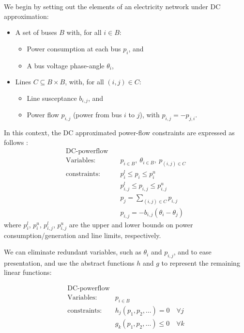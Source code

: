 We begin by setting out the elements of an electricity network under DC approximation:
\begin{itemize}
    \item A set of buses $B$ with, for all $i\in B$:
    \begin{itemize} 
        \item Power consumption at each bus $p_i$, and 
        \item A bus voltage phase-angle $\theta_i$,
    \end{itemize}
    \item Lines $C\subseteq B\times B$, with, for all $(i,j)\in C$: 
        \begin{itemize} 
        \item Line susceptance $b_{i,j}$, and 
        \item Power flow $p_{i,j}$ (power from bus $i$ to $j$), with $p_{i,j}=-p_{j,i}$. 
    \end{itemize}
\end{itemize}
In this context, the DC approximated power-flow constraints are expressed as follows \cite{Wang1}:
\begin{equation}
\label{dcopf1}
\begin{aligned}
\text{DC-powerflow} \quad& \\
\text{Variables:} \quad&  p_{i\in B},\ \theta_{i\in B},\ p_{(i,j)\in C} \\
\text{constraints:} \quad& p_i^{l}\le p_i \le p_i^{u} \\
&p_{i,j}^l \le p_{i,j} \le p_{i,j}^u \\
&p_j = \sum_{(i,j)\in C}p_{i,j}\\
&p_{i,j} = -b_{i,j}(\theta_i - \theta_j)
\end{aligned}
\end{equation}
where $p_i^{l}$, $p_i^{u}$, $p_{i,j}^l$, $p_{i,j}^u$ are the upper and lower bounds on power consumption/generation and line limits, respectively.

We can eliminate redundant variables, such as $\theta_i$ and $p_{i,j}$, and to ease presentation, and use the abstract functions $h$ and $g$ to represent the remaining linear functions:

\begin{equation}
\label{dcopf2}
\begin{aligned}
\text{DC-powerflow}\\
\text{Variables:}\quad & p_{i\in B} \\
\text{constraints:}\quad & h_j(p_1,p_2,\dots)=0\quad \forall j\\
& g_k(p_1,p_2,\dots)\le 0 \quad \forall k
\end{aligned}
\end{equation}

